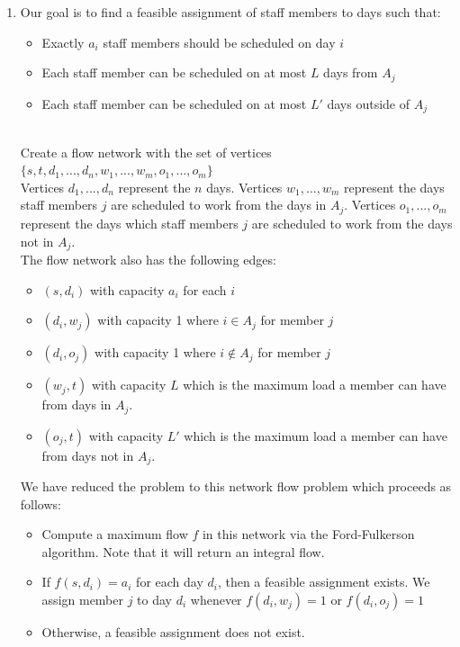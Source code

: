 \documentclass{article}
\begin{document}
\begin{enumerate}
\begin{enumerate}
        \newpage
        \item Our goal is to find a feasible assignment of staff members to days such that:
        \begin{itemize}
            \item Exactly $a_i$ staff members should be scheduled on day $i$
            \item Each staff member can be scheduled on at most $L$ days from $A_j$
            \item Each staff member can be scheduled on at most $L'$ days outside of $A_j$
        \end{itemize}
        \\
        Create a flow network with the set of vertices $\{s, t, d_1, ..., d_n, w_1, ..., w_m, o_1, ..., o_m\}$\\
        Vertices $d_1, ..., d_n$ represent the $n$ days. Vertices $w_1, ..., w_m$ represent the days staff members $j$ are scheduled to work from the days in $A_j$. Vertices $o_1, ..., o_m$ represent the days which staff members $j$ are scheduled to work from the days not in $A_j$.\\
        The flow network also has the following edges:
        \begin{itemize}
            \item $(s, d_i)$ with capacity $a_i$ for each $i$
            \item $(d_i, w_j)$ with capacity 1 where $i \in A_j$ for member $j$
            \item $(d_i, o_j)$ with capacity 1 where $i \not \in A_j$ for member $j$
            \item $(w_j, t)$ with capacity $L$ which is the maximum load a member can have from days in $A_j$.
            \item $(o_j, t)$ with capacity $L'$ which is the maximum load a member can have from days not in $A_j$.
        \end{itemize}
        We have reduced the problem to this network flow problem which proceeds as follows:
        \begin{itemize}
            \item Compute a maximum flow $f$ in this network via the Ford-Fulkerson algorithm. Note that it will return an integral flow.
            \item If $f(s, d_i) = a_i$ for each day $d_i$, then a feasible assignment exists. We assign member $j$ to day $d_i$ whenever $f(d_i, w_j) = 1$ or $f(d_i, o_j) = 1$
            \item Otherwise, a feasible assignment does not exist.

\end{itemize}
\end{enumerate}
\end{enumerate}
\end{document}
